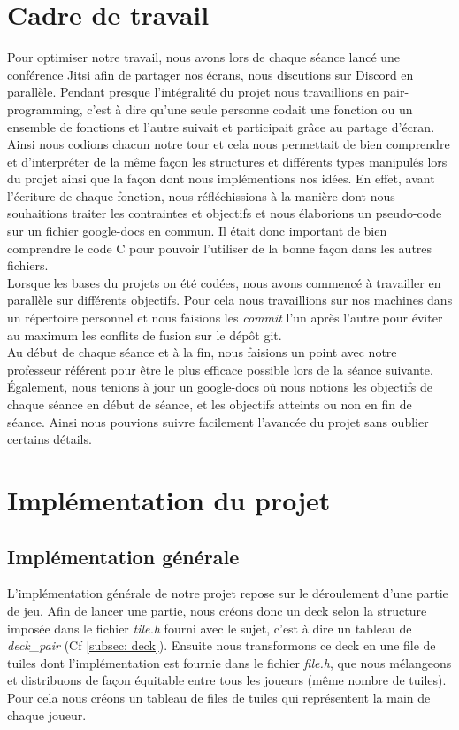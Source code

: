 \documentclass[11pt]{article}
\begin{document}
\section{Cadre de travail}
Pour optimiser notre travail, nous avons lors de chaque séance lancé une conférence Jitsi afin de partager nos écrans, nous discutions sur Discord en parallèle. Pendant presque l'intégralité du projet nous travaillions en pair-programming, c'est à dire qu'une seule personne codait une fonction ou un ensemble de fonctions et l'autre suivait et participait grâce au partage d'écran. Ainsi nous codions chacun notre tour et cela nous permettait de bien comprendre et d'interpréter de la même façon les structures et différents types manipulés lors du projet ainsi que la façon dont nous implémentions nos idées. En effet, avant l'écriture de chaque fonction, nous réfléchissions à la manière dont nous souhaitions traiter les contraintes et objectifs et nous élaborions un pseudo-code sur un fichier google-docs en commun. Il était donc important de bien comprendre le code C pour pouvoir l'utiliser de la bonne façon dans les autres fichiers.
\\

Lorsque les bases du projets on été codées, nous avons commencé à travailler en parallèle sur différents objectifs. Pour cela nous travaillions sur nos machines dans un répertoire personnel et nous faisions les \emph{commit} l'un après l'autre pour éviter au maximum les conflits de fusion sur le dépôt git.
\\

Au début de chaque séance et à la fin, nous faisions un point avec notre professeur référent pour être le plus efficace possible lors de la séance suivante. Également, nous tenions à jour un google-docs où nous notions les objectifs de chaque séance en début de séance, et les objectifs atteints ou non en fin de séance. Ainsi nous pouvions suivre facilement l'avancée du projet sans oublier certains détails.

\section{Implémentation du projet}

\subsection{Implémentation générale} \label{subsec: implementation}
L'implémentation générale de notre projet repose sur le déroulement d'une partie de jeu. Afin de lancer une partie, nous créons donc un deck selon la structure imposée dans le fichier \emph{tile.h} fourni avec le sujet, c'est à dire un tableau de \emph{deck\_pair} (Cf \ref{subsec: deck}). Ensuite nous transformons ce deck en une file de tuiles dont l'implémentation est fournie dans le fichier \emph{file.h}, que nous mélangeons et distribuons de façon équitable entre tous les joueurs (même nombre de tuiles). Pour cela nous créons un tableau de files de tuiles qui représentent la main de chaque joueur.
\\
\end{document}
